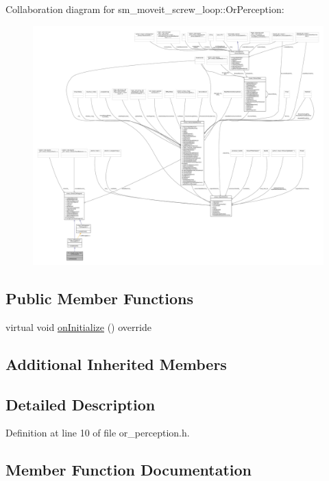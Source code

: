 Collaboration diagram for sm\+\_\+moveit\+\_\+screw\+\_\+loop\+:\+:Or\+Perception\+:
\nopagebreak
\begin{figure}[H]
\begin{center}
\leavevmode
\includegraphics[width=350pt]{classsm__moveit__screw__loop_1_1OrPerception__coll__graph}
\end{center}
\end{figure}
\subsection*{Public Member Functions}
\begin{DoxyCompactItemize}
\item 
virtual void \hyperlink{classsm__moveit__screw__loop_1_1OrPerception_a9d4e4838e39e5e2c8710b747e56de398}{on\+Initialize} () override
\end{DoxyCompactItemize}
\subsection*{Additional Inherited Members}


\subsection{Detailed Description}


Definition at line 10 of file or\+\_\+perception.\+h.



\subsection{Member Function Documentation}
\mbox{\label{classsm__moveit__screw__loop_1_1OrPerception_a9d4e4838e39e5e2c8710b747e56de398}} 

